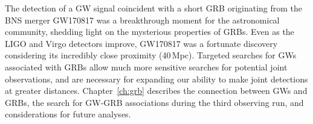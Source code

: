 The detection of a \ac{GW} signal coincident with a short \ac{GRB} originating from the \ac{BNS} merger GW170817 was a breakthrough moment for the astronomical community, shedding light on the mysterious properties of \acp{GRB}.
Even as the LIGO and Virgo detectors improve, GW170817 was a fortunate discovery considering its incredibly close proximity (40\,Mpc).
Targeted searches for \acp{GW} associated with \acp{GRB} allow much more sensitive searches for potential joint observations, and are necessary for expanding our ability to make joint detections at greater distances.
Chapter~\ref{ch:grb} describes the connection between \acp{GW} and \acp{GRB}, the search for GW-GRB associations during the third observing run, and considerations for future analyses.
